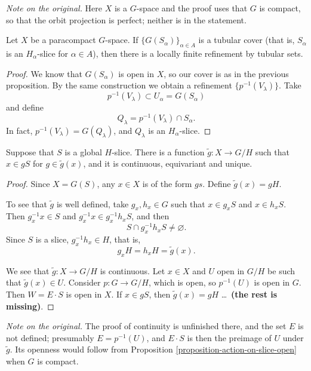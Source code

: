 \noindent
{\it Note on the original.} Here $X$ is
a $G$-space and the proof uses that $G$
is compact, so that the orbit
projection is perfect; neither is in
the statement.

\begin{proposition}
\label{proposition-tubular-refinement}
Let $X$ be a paracompact $G$-space. If
$\{G(S_\alpha)\}_{\alpha\in A}$ is a
tubular cover (that is, $S_\alpha$ is
an $H_\alpha$-slice for $\alpha\in A$),
then there is a locally finite
refinement by tubular sets.
\end{proposition}

\begin{proof}
We know that $G(S_\alpha)$ is open in
$X$, so our cover is as in the previous
proposition. By the same construction
we obtain a refinement
$\{p^{-1}(V_\lambda)\}$. Take
$$
p^{-1}(V_\lambda)
\subset U_\alpha=G(S_\alpha)
$$
and define
$$
Q_\lambda
=p^{-1}(V_\lambda)\cap S_\alpha.
$$
In fact,
$p^{-1}(V_\lambda)=G(Q_\lambda)$, and
$Q_\lambda$ is an $H_\alpha$-slice.
\end{proof}

\begin{proposition}
\label{proposition-map-to-coset-space}
Suppose that $S$ is a global $H$-slice.
There is a function
$\tilde{g}:X\to G/H$ such that
$x\in gS$ for $g\in\tilde{g}(x)$, and
it is continuous, equivariant and
unique.
\end{proposition}

\begin{proof}
Since $X=G(S)$, any $x\in X$ is of the
form $gs$. Define $\tilde{g}(x)=gH$.

To see that $\tilde{g}$ is well
defined, take $g_x,h_x\in G$ such that
$x\in g_xS$ and $x\in h_xS$. Then
$g_x^{-1}x\in S$ and
$g_x^{-1}x\in g_x^{-1}h_xS$, and then
$$
S\cap g^{-1}_xh_xS\neq\varnothing.
$$
Since $S$ is a slice,
$g^{-1}_xh_x\in H$, that is,
$$
g_xH=h_xH=\tilde{g}(x).
$$

We see that $\tilde{g}:X\to G/H$ is
continuous. Let $x\in X$ and $U$ open
in $G/H$ be such that
$\tilde{g}(x)\in U$. Consider
$p:G\to G/H$, which is open, so
$p^{-1}(U)$ is open in $G$. Then
$W=E\cdot S$ is open in $X$. If
$x\in gS$, then $\tilde{g}(x)=gH$
\ldots\ {\bf (the rest is missing)}.
\end{proof}

\noindent
{\it Note on the original.} The proof
of continuity is unfinished there, and
the set $E$ is not defined; presumably
$E=p^{-1}(U)$, and $E\cdot S$ is then
the preimage of $U$ under $\tilde{g}$.
Its openness would follow from
Proposition
\ref{proposition-action-on-slice-open}
when $G$ is compact.

